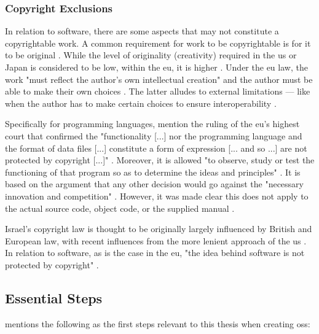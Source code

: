 \subsubsection{Copyright Exclusions}

In relation to software, there are some aspects that may not constitute a copyrightable work.
A common requirement for work to be copyrightable is for it to be original \parencite{Fisher_2016}.
While the level of originality (creativity) required in the \gls{us} or Japan is considered to be low, within the \gls{eu}, it is higher \parencite{Fisher_2016}.
Under the \gls{eu} law, the work "must reflect the author's own intellectual creation" and the author must be able to make their own choices \parencite[p. 443]{Fisher_2016}.
The latter alludes to external limitations --- like when the author has to make certain choices to ensure interoperability \parencite{Fisher_2016}.

Specifically for programming languages, \textcite{Rose_2012} mention the ruling of the \gls{eu}'s highest court that confirmed the "functionality [...] nor the programming language and the format of data files [...] constitute a form of expression [... and so ...] are not protected by copyright [...]" \parencite{cjeu_2012}.
Moreover, it is allowed "to observe, study or test the functioning of that program so as to determine the ideas and principles" \parencite{cjeu_2012}.
It is based on the argument that any other decision would go against the "necessary innovation and competition" \parencite{Rose_2012}.
However, it was made clear this does not apply to the actual source code, object code, or the supplied manual \parencite{Rose_2012}.

Israel's copyright law is thought to be originally largely influenced by British and European law, with recent influences from the more lenient approach of the \gls{us} \parencite{Greenman_2012}.
In relation to software, as is the case in the \gls{eu}, "the idea behind software is not protected by copyright" \parencite{suslina_approaches_2018}.

\subsection{Essential Steps}
\label{sec:oss-essential-steps}

\textcite[Chapter~2]{Fogel_2022} mentions the following as the first steps relevant to this thesis when creating \gls{oss}:

